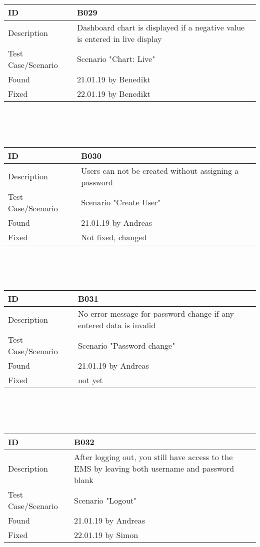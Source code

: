 \documentclass{scrreprt}
\begin{document}
\\ \\ \\
\begin{tabularx}{12cm}{l|X}
ID					& B029  \\
\hline
Description 		& 
Dashboard chart is displayed if a negative value is entered in live display\\
\hline
Test Case/Scenario	& Scenario "Chart: Live"  \\
\hline
Found				& 21.01.19 by Benedikt  \\
\hline
Fixed				& 22.01.19 by Benedikt\\ 
\end{tabularx}
\\ \\ \\
\begin{tabularx}{12cm}{l|X}
ID					& B030  \\
\hline
Description 		& 
Users can not be created without assigning a password\\
\hline
Test Case/Scenario	& Scenario "Create User"  \\
\hline
Found				& 21.01.19 by Andreas  \\
\hline
Fixed				& Not fixed, changed\\ 
\end{tabularx}
\\ \\ \\
\begin{tabularx}{12cm}{l|X}
ID					& B031  \\
\hline
Description 		& 
No error message for password change if any entered data is invalid\\
\hline
Test Case/Scenario	& Scenario "Password change"  \\
\hline
Found				& 21.01.19 by Andreas  \\
\hline
Fixed				& not yet\\ 
\end{tabularx}
\\ \\ \\
\begin{tabularx}{12cm}{l|X}
ID					& B032 \\
\hline
Description 		& 
After logging out, you still have access to the EMS by leaving both username and password blank\\
\hline
Test Case/Scenario	& Scenario "Logout"  \\
\hline
Found				& 21.01.19 by Andreas  \\
\hline
Fixed				& 22.01.19 by Simon\\ 
\end{tabularx}
\end{document}
